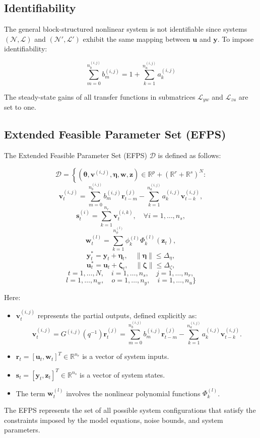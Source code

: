 \subsection{Identifiability}

The general block-structured nonlinear system is not identifiable since systems $(\mathcal{N}, \mathcal{L})$ and $(\mathcal{N}', \mathcal{L}')$ exhibit the same mapping between $\mathbf{u}$ and $\mathbf{y}$. To impose identifiability:

\[
\sum_{m=0}^{n_b^{(i,j)}} b_m^{(i,j)} = 1 + \sum_{k=1}^{n_a^{(i,j)}} a_k^{(i,j)}
\]

The steady-state gains of all transfer functions in submatrices $\mathcal{L}_{yw}$ and $\mathcal{L}_{zu}$ are set to one.

\subsection{Extended Feasible Parameter Set (EFPS)}

The Extended Feasible Parameter Set (EFPS) $\mathcal{D}$ is defined as follows:

\[
\mathcal{D} = \left\{
(\boldsymbol{\theta}, \mathbf{v}^{(i,j)}, \boldsymbol{\eta}, \mathbf{w}, \mathbf{z}) \in \mathbb{R}^p + (\mathbb{R}^r + \mathbb{R}^s)^N :
\right.
\]
\[
\mathbf{v}_t^{(i,j)} = \sum_{m=0}^{n_b^{(i,j)}} b_m^{(i,j)} \mathbf{r}_{t-m}^{(j)} - \sum_{k=1}^{n_a^{(i,j)}} a_k^{(i,j)} \mathbf{v}_{t-k}^{(i,j)},
\]
\[
\mathbf{s}_t^{(i)} = \sum_{k=1}^{n_r} \mathbf{v}_t^{(i,k)}, \quad \forall i = 1, \dots, n_s,
\]
\[
\mathbf{w}_t^{(l)} = \sum_{k=1}^{n_\phi^{(l)}} \phi_k^{(l)} \Phi_k^{(l)}(\mathbf{z}_t),
\]
\[
\mathbf{y}_t^\ast = \mathbf{y}_t + \boldsymbol{\eta}_t, \quad \|\boldsymbol{\eta}\| \leq \Delta_\eta,
\]
\[
\mathbf{u}_t^\ast = \mathbf{u}_t + \boldsymbol{\zeta}_t, \quad \|\boldsymbol{\zeta}\| \leq \Delta_\zeta,
\]
\[
t = 1, \dots, N, \quad i = 1, \dots, n_s, \quad j = 1, \dots, n_r,
\]
\[
l = 1, \dots, n_w, \quad o = 1, \dots, n_y, \quad i = 1, \dots, n_u
\}
\]

Here:

\begin{itemize}
    \item $\mathbf{v}_t^{(i,j)}$ represents the partial outputs, defined explicitly as:
    \[
    \mathbf{v}_t^{(i,j)} = G^{(i,j)}(q^{-1}) \mathbf{r}_t^{(j)} = \sum_{m=0}^{n_b^{(i,j)}} b_m^{(i,j)} \mathbf{r}_{t-m}^{(j)} - \sum_{k=1}^{n_a^{(i,j)}} a_k^{(i,j)} \mathbf{v}_{t-k}^{(i,j)}.
    \]
    \item $\mathbf{r}_t = [\mathbf{u}_t, \mathbf{w}_t]^T \in \mathbb{R}^{n_r}$ is a vector of system inputs.
    \item $\mathbf{s}_t = [\mathbf{y}_t, \mathbf{z}_t]^T \in \mathbb{R}^{n_s}$ is a vector of system states.
    \item The term $\mathbf{w}_t^{(l)}$ involves the nonlinear polynomial functions $\Phi_k^{(l)}$.
\end{itemize}
The EFPS represents the set of all possible system configurations that satisfy the constraints imposed by the model equations, noise bounds, and system parameters.


